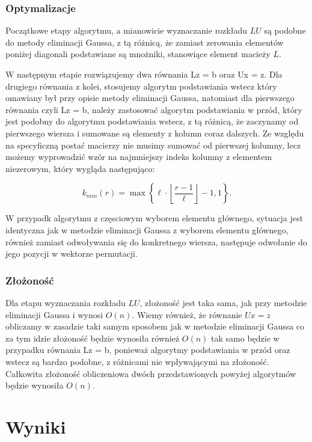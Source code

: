 \documentclass[12pt, a4paper]{article}
\begin{document}
\subsubsection{Optymalizacje}

Początkowe etapy algorytmu, a mianowicie wyznaczanie rozkładu $LU$ są podobne do metody eliminacji Gaussa, z tą różnicą, że zamiast zerowania elementów poniżej diagonali podstawiane są mnożniki, stanowiące element macieży $L$.

\noindent W następnym etapie rozwiązujemy dwa równania Lz = b oraz Ux = z. Dla drugiego równania z kolei, stosujemy algorytm podstawiania wstecz który omawiany był przy opisie metody eliminacji Gaussa, natomiast dla pierwszego równania czyli 
Lz = b, należy zastosować algorytm podstawiania w przód, który jest podobny do algorytmu podstawiania wstecz, z tą różnicą, że zaczynamy od pierwszego wiersza i sumowane są elementy z kolumn coraz dalszych. Ze względu na specyficzną postać macierzy nie musimy sumować od pierwszej kolumny, lecz możemy wyprowadzić wzór na najmniejszy indeks kolumny z elementem niezerowym, który wygląda następująco:

\begin{equation}
k_{min}(r) = \max\left\lbrace\ell \cdot \left \lfloor\frac{r - 1}{\ell}\right \rfloor - 1, 1 \right\rbrace.
\end{equation}

\noindent W przypadk algorytmu z częsciowym wyborem elementu głównego, sytuacja jest identyczna jak w metodzie eliminacji Gaussa z wyborem elementu głównego, również zamiast odwoływania się do konkretnego wiersza, następuje odwołanie do jego pozycji w wektorze permutacji.

\subsubsection*{Złożoność}
Dla etapu wyznaczania rozkładu $LU$, złożoność jest taka sama, jak przy metodzie eliminacji Gaussa i wynosi $O(n)$. Wiemy również, że równanie $Ux = z$ obliczamy w zasadzie taki samym sposobem jak w metodzie eliminacji Gaussa co za tym idzie złożoność będzie wynosiła również $O(n)$ tak samo będzie w przypadku równania Lz = b, ponieważ algorytmy podstawiania w przód oraz wstecz są bardzo podobne, z różnicami nie wpływającymi na złożoność. Całkowita złożoność obliczeniowa dwóch przedstawionych powyżej algorytmów będzie wynosiła $O(n)$.

\section{Wyniki}
\end{document}
